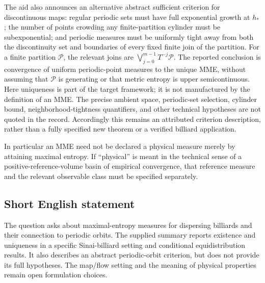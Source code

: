 \documentclass[11pt]{article}
\begin{document}
The aid also announces an alternative abstract sufficient criterion for discontinuous maps: regular periodic sets must have full exponential growth at $h_*$; the number of points crowding any finite-partition cylinder must be subexponential; and periodic measures must be uniformly tight away from both the discontinuity set and boundaries of every fixed finite join of the partition. For a finite partition $\mathcal P$, the relevant joins are $\bigvee_{j=0}^{m-1}T^{-j}\mathcal P$. The reported conclusion is convergence of uniform periodic-point measures to the unique MME, without assuming that $\mathcal P$ is generating or that metric entropy is upper semicontinuous. Here uniqueness is part of the target framework; it is not manufactured by the definition of an MME. The precise ambient space, periodic-set selection, cylinder bound, neighborhood-tightness quantifiers, and other technical hypotheses are not quoted in the record. Accordingly this remains an attributed criterion description, rather than a fully specified new theorem or a verified billiard application.

In particular an MME need not be declared a physical measure merely by attaining maximal entropy. If ``physical'' is meant in the technical sense of a positive-reference-volume basin of empirical convergence, that reference measure and the relevant observable class must be specified separately.
\subsection{Short English statement}
The question asks about maximal-entropy measures for dispersing billiards and their connection to periodic orbits. The supplied summary reports existence and uniqueness in a specific Sinai-billiard setting and conditional equidistribution results. It also describes an abstract periodic-orbit criterion, but does not provide its full hypotheses. The map/flow setting and the meaning of physical properties remain open formulation choices.
\end{document}
